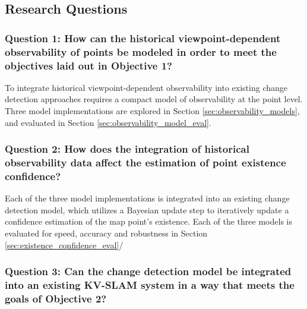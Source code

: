 \subsection{Research Questions}

\subsubsection*{Question 1: How can the historical viewpoint-dependent observability of points be modeled in order to meet the objectives laid out in Objective 1?}

To integrate historical viewpoint-dependent observability into existing change detection approaches requires a compact model of observability at the point level. Three model implementations are explored in Section \ref{sec:observability_models}, and evaluated in Section \ref{sec:observability_model_eval}.

\subsubsection*{Question 2: How does the integration of historical observability data affect the estimation of point existence confidence?}

Each of the three model implementations is integrated into an existing change detection model,  which utilizes a Bayesian update step to iteratively update a confidence estimation of the map point's existence. Each of the three models is evaluated for speed, accuracy and robustness in Section \ref{sec:existence_confidence_eval}/

\subsubsection*{Question 3: Can the change detection model be integrated into an existing KV-SLAM system in a way that meets the goals of Objective 2?}